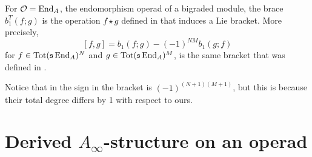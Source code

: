 \documentclass[join.tex]{subfiles}
\begin{document}
%
%
%
%
%
%
\begin{corollary}\label{biliebracket}
 For ${\mathcal O} = \operatorname{End}_A$, the endomorphism operad of a bigraded module, the brace $b_1^T(f;g)$ is the operation $f\star g$ defined in \cite{LRW} that induces a Lie bracket. More precisely,
\[
[f,g]=b_1(f;g)-(-1)^{NM}b_1(g;f)
\]
for $f\in\mathrm{Tot}(\mathfrak{s}\operatorname{End}_A)^N$ and $g\in\mathrm{Tot}(\mathfrak{s}\operatorname{End}_A)^M$, is the same bracket that was defined in \cite{LRW}. 
\end{corollary}

Notice that in \cite{LRW} the sign in the bracket is $(-1)^{(N+1)(M+1)}$, but this is because their total degree differs by 1 with respect to ours.

\section{Derived $A_\infty$-structure on an operad}\label{derivedstructure}
\end{document}
